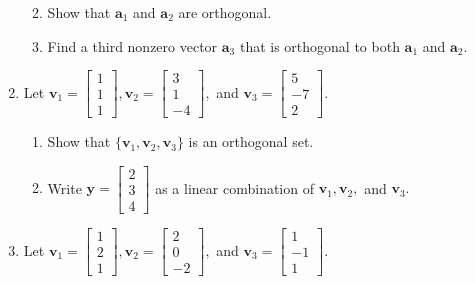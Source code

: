 \documentclass[
]{book}
\providecommand{\tightlist}{%
  \setlength{\itemsep}{0pt}\setlength{\parskip}{0pt}}
\theoremstyle{definition}
\theoremstyle{definition}
\theoremstyle{definition}
\theoremstyle{definition}
\theoremstyle{remark}
\begin{document}
\begin{enumerate}
  \begin{enumerate}
  \def\labelenumii{\alph{enumii}.}
  \tightlist
  \item
    Show that \(\mathbf{a}_1\) and \(\mathbf{a}_2\) are orthogonal.
  \item
    Find a third nonzero vector \(\mathbf{a}_3\) that is orthogonal to both \(\mathbf{a}_1\) and \(\mathbf{a}_2.\)
  \end{enumerate}
\item
  Let \(\mathbf{v}_1=\begin{bmatrix}1\\1\\1\end{bmatrix},\mathbf{v}_2=\begin{bmatrix} 3\\1\\-4\end{bmatrix},\) and \(\mathbf{v}_3=\begin{bmatrix}5\\-7\\2\end{bmatrix}.\)

  \begin{enumerate}
  \def\labelenumii{\alph{enumii}.}
  \tightlist
  \item
    Show that \(\{\mathbf{v}_1,\mathbf{v}_2,\mathbf{v}_3\}\) is an orthogonal set.
  \item
    Write \(\mathbf{y}=\begin{bmatrix} 2\\3\\4\end{bmatrix}\) as a linear combination of \(\mathbf{v}_1,\mathbf{v}_2,\) and \(\mathbf{v}_3.\)
  \end{enumerate}
\item
  Let \(\mathbf{v}_1=\begin{bmatrix}1\\2\\1\end{bmatrix},\mathbf{v}_2=\begin{bmatrix} 2\\0\\-2\end{bmatrix},\) and \(\mathbf{v}_3=\begin{bmatrix}1\\-1\\1\end{bmatrix}.\)


\end{enumerate}
\end{document}
